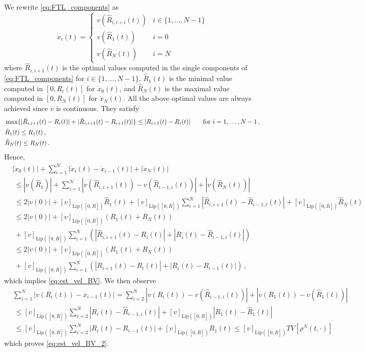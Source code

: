 \documentclass[reqno,oneside]{amsart}
\theoremstyle{plain}
\begin{document}
\proof
We rewrite \eqref{eq:FTL_components} as
\[\dot{x}_i(t)= \begin{cases}
    v(\hat{R}_{i,i+i}(t)) & i\in\{1,\ldots,N-1\}\\
    v(\hat{R}_1(t)) & i=0\\
    v(\hat{R}_N(t)) & i=N
\end{cases}\]
where $\hat{R}_{i,i+1}(t)$ is the optimal values computed in the single components of \eqref{eq:FTL_components} for $i\in\{1,\ldots,N-1\}$, $\hat{R}_1(t)$ is the minimal value computed in $[0,R_i(t)]$ for $\dot{x}_0(t)$, and $\hat{R}_N(t)$ is the maximal value computed in $[0,R_N(t)]$ for $\dot{x}_N(t)$. All the above optimal values are always achieved since $v$ is continuous. They satisfy
\begin{align*}
    & \max\{|\hat{R}_{i,i+1}(t)-R_i(t)|+|\hat{R}_{i,i+1}(t)-R_{i+1}(t)|\}\leq |R_{i+1}(t)-R_i(t)|\qquad \hbox{for $i=1,\ldots,N-1$}\,,\\
    & \hat{R}_1(t)\leq R_1(t)\,,\\
    & \hat{R}_N(t)\leq R_N(t)\,.
\end{align*}
Hence,
    \begin{align*}
        & |\dot{x}_0(t)|+\sum_{i=1}^N|\dot{x}_i(t)-\dot{x}_{i-1}(t)| + |\dot{x}_N(t)|\\
    & \ \leq |v(\hat{R}_{1})|+\sum_{i=1}^N|v(\hat{R}_{i,i+1}(t))-v(\hat{R}_{i-1,i}(t))|+ |v(\hat{R}_N(t))|\\
    & \ \leq 2|v(0)|+[v]_{\mathrm{Lip}([0,\overline{R}])}\hat{R}_1(t)+ [v]_{\mathrm{Lip}([0,\overline{R}])}\sum_{i=1}^N|\hat{R}_{i,i+1}(t)-\hat{R}_{i-1,t}(t)| + [v]_{\mathrm{Lip}([0,\overline{R}])}\hat{R}_N(t)\\
    & \ \leq 2|v(0)|+[v]_{\mathrm{Lip}([0,\overline{R}])}\left(R_1(t)+R_N(t)\right)\\
    &  \ + [v]_{\mathrm{Lip}([0,\overline{R}])}\sum_{i=1}^N\left(|\hat{R}_{i,i+1}(t)-R_i(t)|+|R_i(t)-\hat{R}_{i-1,i}(t)|\right)\\
    & \ \leq 2|v(0)|+[v]_{\mathrm{Lip}([0,\overline{R}])}\left(R_1(t)+R_N(t)\right)\\
    &  \ + [v]_{\mathrm{Lip}([0,\overline{R}])}\sum_{i=1}^N\left(|R_{i+1}(t)-R_i(t)|+|R_i(t)-R_{i-1}(t)|\right)\,,
    \end{align*}
    which implies \eqref{eq:est_vel_BV}. We then observe
    \begin{align*}
        & \sum_{i=1}^N|v(R_i(t))-\dot{x}_{i-1}(t)|= \sum_{i=2}^N|v(R_i(t))-v(\hat{R}_{i-1,i}(t))|+|v(R_1(t))-v(\hat{R}_1(t))|\\
        & \ \leq [v]_{\mathrm{Lip}([0,\overline{R}])}\sum_{i=2}^N |R_i(t)-\hat{R}_{i-1,i}(t)|+[v]_{\mathrm{Lip}([0,\overline{R}])}|R_1(t)-\hat{R}_1(t)|\\
        & \ \leq [v]_{\mathrm{Lip}([0,\overline{R}])}\sum_{i=2}^N |R_i(t)-R_{i-1}(t)|+[v]_{\mathrm{Lip}([0,\overline{R}])}R_1(t)\leq [v]_{\mathrm{Lip}([0,\overline{R}])}TV[\rho^N(t,\cdot)]
    \end{align*}
    which proves \eqref{eq:est_vel_BV_2}.
\endproof
\end{document}
